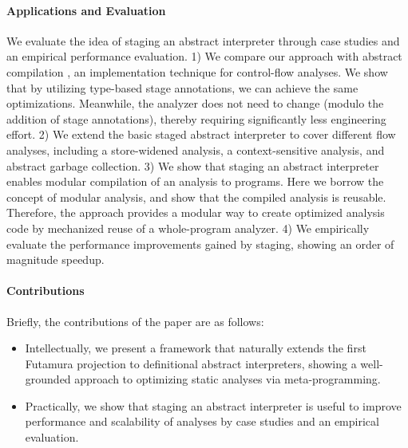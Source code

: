 \paragraph{Applications and Evaluation}
We evaluate the idea of staging an abstract interpreter through
case studies and an empirical performance evaluation.
1) We compare our approach with abstract compilation
\cite{Boucher:1996:ACN:647473.727587}, an implementation technique for
control-flow analyses. We show that by utilizing type-based stage
annotations, we can achieve the same optimizations. Meanwhile,
the analyzer does not need to change (modulo the addition of stage annotations),
thereby requiring significantly less engineering effort.
2) We extend the basic staged abstract interpreter to cover different flow
analyses, including a store-widened analysis, a context-sensitive
analysis, and abstract garbage collection.
3) We show that staging an abstract interpreter enables modular
compilation of an analysis to programs. Here we borrow the concept of
modular analysis, and show that the compiled analysis is reusable.
Therefore, the approach provides a modular way to create optimized
analysis code by mechanized reuse of a whole-program analyzer.
4) We empirically evaluate the performance improvements gained by staging,
showing an order of magnitude speedup.

\paragraph{Contributions} Briefly, the contributions of the paper are as follows:
\begin{itemize}[leftmargin=2em]
  \item Intellectually, we present a framework that naturally extends the first
    Futamura projection to definitional abstract interpreters, showing a
    well-grounded approach to optimizing static analyses via meta-programming.
  \item Practically, we show that staging an abstract interpreter is useful to
    improve performance and scalability of analyses by case studies and an
    empirical evaluation.
\end{itemize}


